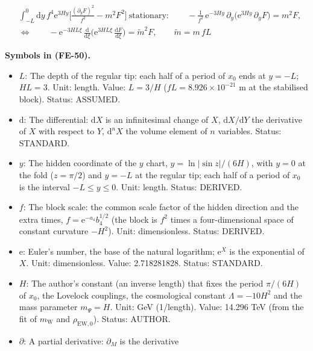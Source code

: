 \documentclass[
  10pt,
]{article}
\providecommand{\tightlist}{%
  \setlength{\itemsep}{0pt}\setlength{\parskip}{0pt}}
\begin{document}
\[
\begin{aligned}
&\int_{-L}^{0}\mathrm{d}y\,f^4\mathrm{e}^{3Hy}\Big[\frac{(\partial_yF)^2}{f^2} -
 m^2F^2\Big]\ \text{stationary}:\qquad
 -\frac{1}{f^2}\,\mathrm{e}^{-3Hy}\,\partial_y\big(\mathrm{e}^{3Hy}\,\partial_yF\big) = m^2F,\\
&\Leftrightarrow\qquad
 -\mathrm{e}^{-3HL\xi}\,\frac{\mathrm{d}}{\mathrm{d}\xi}\Big(\mathrm{e}^{3HL\xi}\,\frac{\mathrm{d}F}{
 \mathrm{d}\xi}\Big)
 = \tilde m^2F,\qquad \tilde m = m\,fL
\end{aligned} \tag{FE-50}
\]

\textbf{Symbols in (FE-50).}

\begin{itemize}
\tightlist
\item
  \(L\): The depth of the regular tip: each half of a period of \(x_0\)
  ends at \(y = -L\); \(HL = 3\). Unit: length. Value: \(L = 3/H\)
  (\(fL = 8.926\times10^{-21}\) m at the stabilised block). Status:
  ASSUMED.
\item
  \(\mathrm{d}\): The differential: \(\mathrm{d}X\) is an infinitesimal
  change of \(X\), \(\mathrm{d}X/\mathrm{d}Y\) the derivative of \(X\)
  with respect to \(Y\), \(\mathrm{d}^nX\) the volume element of \(n\)
  variables. Status: STANDARD.
\item
  \(y\): The hidden coordinate of the \(y\) chart,
  \(y = \ln\lvert\sin z\rvert/(6H)\), with \(y = 0\) at the fold
  (\(z = \pi/2\)) and \(y = -L\) at the regular tip; each half of a
  period of \(x_0\) is the interval \(-L \le y \le 0\). Unit: length.
  Status: DERIVED.
\item
  \(f\): The block scale: the common scale factor of the hidden
  direction and the extra times, \(f = \mathrm{e}^{-a_4}b_4^{1/2}\) (the
  block is \(f^2\) times a four-dimensional space of constant curvature
  \(-H^2\)). Unit: dimensionless. Status: DERIVED.
\item
  \(\mathrm{e}\): Euler's number, the base of the natural logarithm;
  \(\mathrm{e}^{X}\) is the exponential of \(X\). Unit: dimensionless.
  Value: 2.718281828. Status: STANDARD.
\item
  \(H\): The author's constant (an inverse length) that fixes the period
  \(\pi/(6H)\) of \(x_0\), the Lovelock couplings, the cosmological
  constant \(\Lambda = -10H^2\) and the mass parameter \(m_\Psi = H\).
  Unit: GeV (1/length). Value: 14.296 TeV (from the fit of
  \(m_{\mathrm{W}}\) and \(\rho_{\mathrm{EW},0}\)). Status: AUTHOR.
\item
  \(\partial\): A partial derivative: \(\partial_M\) is the derivative

\end{itemize}
\end{document}
